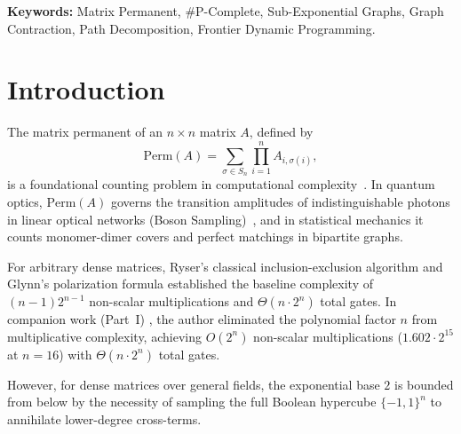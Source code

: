 \documentclass[11pt,a4paper]{article}
\theoremstyle{definition}
\newcommand{\Perm}{\mathrm{Perm}}
\begin{document}
\vspace{0.5em}
\noindent\textbf{Keywords:} Matrix Permanent, \#P-Complete, Sub-Exponential Graphs, Graph Contraction, Path Decomposition, Frontier Dynamic Programming.

\section{Introduction}

The matrix permanent of an $n \times n$ matrix $A$, defined by
\begin{equation}
\Perm(A) = \sum_{\sigma \in S_n} \prod_{i=1}^n A_{i, \sigma(i)},
\end{equation}
is a foundational counting problem in computational complexity~\cite{valiant1979}. In quantum optics, $\Perm(A)$ governs the transition amplitudes of indistinguishable photons in linear optical networks (Boson Sampling)~\cite{aaronson2011}, and in statistical mechanics it counts monomer-dimer covers and perfect matchings in bipartite graphs.

For arbitrary dense matrices, Ryser's classical inclusion-exclusion algorithm \cite{ryser1963} and Glynn's polarization formula \cite{glynn2010} established the baseline complexity of $(n-1)2^{n-1}$ non-scalar multiplications and $\Theta(n \cdot 2^n)$ total gates. In companion work (Part~I) \cite{part1_paper}, the author eliminated the polynomial factor $n$ from multiplicative complexity, achieving $O(2^n)$ non-scalar multiplications ($1.602 \cdot 2^{15}$ at $n = 16$) with $\Theta(n \cdot 2^n)$ total gates.

However, for dense matrices over general fields, the exponential base $2$ is bounded from below by the necessity of sampling the full Boolean hypercube $\{-1, 1\}^n$ to annihilate lower-degree cross-terms.
\end{document}
